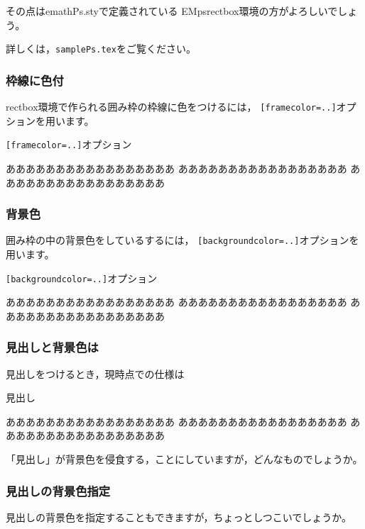その点は\textsf{emathPs.sty}で定義されている
\textsf{EMpsrectbox}環境の方がよろしいでしょう。

詳しくは，\texttt{samplePs.tex}をご覧ください。

\subsubsection{枠線に色付}
\textsf{rectbox}環境で作られる囲み枠の枠線に色をつけるには，
\texttt{[framecolor=..]}オプションを用います。

\begin{showEx}{\texttt{[framecolor=..]}オプション}
\begin{rectbox}[framecolor=red]
あああああああああああああああああ
あああああああああああああああああ
あああああああああああああああああ
\end{rectbox}
\end{showEx}

\subsubsection{背景色}
囲み枠の中の背景色をしているするには，
\texttt{[backgroundcolor=..]}オプションを用います。

\begin{showEx}{\texttt{[backgroundcolor=..]}オプション}
\begin{rectbox}[framecolor=red,%
  backgroundcolor=cyan]
あああああああああああああああああ
あああああああああああああああああ
あああああああああああああああああ
\end{rectbox}
\end{showEx}

\subsubsection{見出しと背景色は}
見出しをつけるとき，現時点での仕様は

\begin{showEx}{見出し}
\begin{rectbox}[framecolor=red,%
  backgroundcolor=cyan,item=見出し]
あああああああああああああああああ
あああああああああああああああああ
あああああああああああああああああ
\end{rectbox}
\end{showEx}

\noindent
「見出し」が背景色を侵食する，ことにしていますが，どんなものでしょうか。

\subsubsection{見出しの背景色指定}
見出しの背景色を指定することもできますが，ちょっとしつこいでしょうか。

